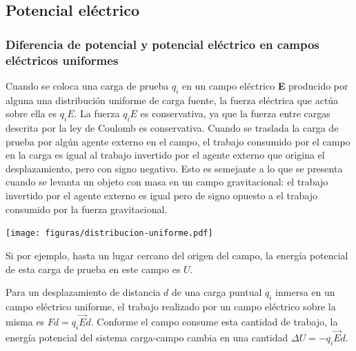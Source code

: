 \documentclass{article}
\begin{document}
\pagebreak


\subsection{Potencial eléctrico}
\subsubsection{Diferencia de potencial y potencial eléctrico en campos eléctricos uniformes}

Cuando se coloca una carga de prueba $q_i$ en un campo eléctrico \textbf{E} producido por alguna una distribución uniforme de carga fuente, la fuerza eléctrica que actúa sobre ella es $q_iE$. La fuerza $q_iE$ es conservativa, ya que la fuerza entre cargas descrita por la ley de Coulomb es conservativa. Cuando se traslada la carga de prueba por algún agente externo en el campo, el trabajo consumido por el campo en la carga es igual al trabajo invertido por el agente externo que origina el desplazamiento, pero con signo negativo. Esto es semejante a lo que se presenta cuando se levanta un objeto con masa en un campo gravitacional: el trabajo invertido por el agente externo es igual pero de signo opuesto a el trabajo consumido por la fuerza gravitacional.

\begin{center}
	\texttt{[image: figuras/distribucion-uniforme.pdf]}
\label{fig:cargasneg}
\end{center}

Si por ejemplo,  hasta un lugar cercano del origen del campo, la energía potencial de esta carga de prueba en este campo es $U$.

Para un desplazamiento de distancia $d$ de una carga puntual $q_i$ inmersa en un campo eléctrico uniforme, el trabajo realizado por un campo eléctrico sobre la misma es $Fd = q_i\vec{E}d$. Conforme el campo consume esta cantidad de trabajo, la energía potencial del 
sistema carga-campo cambia en una cantidad $ \Delta U = -q_i \vec{E}d$.
\end{document}
